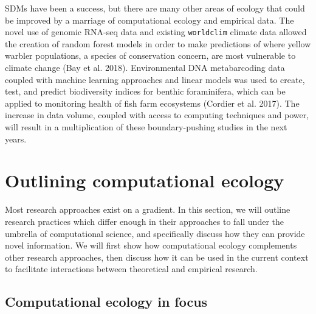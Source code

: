 \documentclass[12pt]{article}
\begin{document}
SDMs have been a success, but there are many other areas of ecology that
could be improved by a marriage of computational ecology and empirical
data. The novel use of genomic RNA-seq data and existing
\passthrough{\lstinline!worldclim!} climate data allowed the creation of
random forest models in order to make predictions of where yellow
warbler populations, a species of conservation concern, are most
vulnerable to climate change (Bay et al. 2018). Environmental DNA
metabarcoding data coupled with machine learning approaches and linear
models was used to create, test, and predict biodiversity indices for
benthic foraminifera, which can be applied to monitoring health of fish
farm ecosystems (Cordier et al. 2017). The increase in data volume,
coupled with access to computing techniques and power, will result in a
multiplication of these boundary-pushing studies in the next years.

\hypertarget{outlining-computational-ecology}{%
\section{Outlining computational
ecology}\label{outlining-computational-ecology}}

Most research approaches exist on a gradient. In this section, we will
outline research practices which differ enough in their approaches to
fall under the umbrella of computational science, and specifically
discuss how they can provide novel information. We will first show how
computational ecology complements other research approaches, then
discuss how it can be used in the current context to facilitate
interactions between theoretical and empirical research.

\hypertarget{computational-ecology-in-focus}{%
\subsection{Computational ecology in
focus}\label{computational-ecology-in-focus}}
\end{document}
